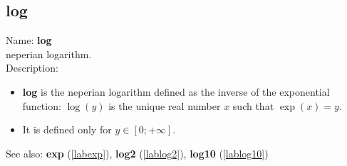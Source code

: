 \subsection{log}
\label{lablog}
\noindent Name: \textbf{log}\\
neperian logarithm.\\

\noindent Description: \begin{itemize}

\item \textbf{log} is the neperian logarithm defined as the inverse of the exponential
   function: $\log(y)$ is the unique real number $x$ such that $\exp(x)=y$.

\item It is defined only for $y \in [0; +\infty]$.
\end{itemize}
See also: \textbf{exp} (\ref{labexp}), \textbf{log2} (\ref{lablog2}), \textbf{log10} (\ref{lablog10})

